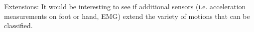 Extensions:
It would be interesting to see if additional sensors (i.e. acceleration measurements on foot or hand, EMG) extend the variety of motions that can be classified.
